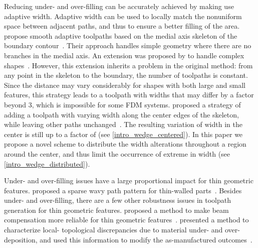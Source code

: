 Reducing under- and over-filling can be accurately achieved by making use  adaptive  width.
Adaptive width can be used to locally match the nonuniform space between adjacent paths, and thus to ensure a better filling of the area.
\citeauthor{kao1998optimal} propose smooth adaptive toolpaths based on the medial axis skeleton of the boundary contour~\cite{kao1998optimal}.
Their approach handles simple geometry where there are no branches in the medial axis.
An extension was proposed by \citeauthor{Ding2016a} to handle complex shapes~\cite{Ding2016a}.
However, this extension inherits a problem in the original method:
from any point in the skeleton to the boundary, the number of toolpaths is constant.
Since the distance may vary considerably for shapes with both large and small features, this strategy leads to a toolpath with widths that may differ by a factor beyond $3$, which is impossible for some FDM systems.
\citeauthor{Jin2017JMS} proposed a strategy of adding a toolpath with varying width along the center edges of the skeleton, while leaving other paths unchanged~\cite{Jin2017JMS}.
The resulting variation of width in the center is still up to a factor of  (see \cref{intro_wedge_centered}).
In this paper we propose a novel scheme to distribute the width alterations throughout a region around the center, and thus limit the occurrence of extreme  in width (see \cref{intro_wedge_distributed}).

Under- and over-filling issues have a large proportional impact for thin geometric features.
\citeauthor{Jin2017a} proposed a sparse wavy path pattern for thin-walled parts~\cite{Jin2017a}.
Besides under- and over-filling, there are a few other robustness issues in toolpath generation for thin geometric features.
\citeauthor{Moesen2011} proposed a method to make beam compensation more reliable for thin geometric features~\cite{Moesen2011}.
\citeauthor{Behandish2019a} presented a method to characterize local- topological discrepancies due to material under- and over-deposition, and used this information to modify the as-manufactured outcomes~\cite{Behandish2019a}. 



